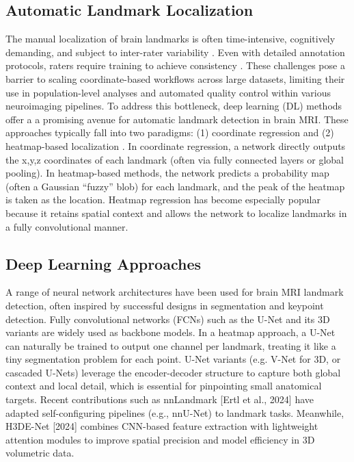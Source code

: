 \subsection{Automatic Landmark Localization}
The manual localization of brain landmarks is often time-intensive, cognitively demanding, and subject to inter-rater variability \cite{Abbass2022-lf, Lau2019-eh,Pallavaram2008-zr}. Even with detailed annotation protocols, raters require training to achieve consistency \cite{Lau2019-eh}. These challenges pose a barrier to scaling coordinate-based workflows across large datasets, limiting their use in population-level analyses and automated quality control within various neuroimaging pipelines. To address this bottleneck, deep learning (DL) methods offer a a promising avenue for automatic landmark detection in brain MRI. These approaches typically fall into two paradigms: (1) coordinate regression \cite{Neupane2024-vt} and (2) heatmap-based localization \cite{Payer2016-ik}. In coordinate regression, a network directly outputs the x,y,z coordinates of each landmark (often via fully connected layers or global pooling). In heatmap-based methods, the network predicts a probability map (often a Gaussian “fuzzy” blob) for each landmark, and the peak of the heatmap is taken as the location. Heatmap regression has become especially popular because it retains spatial context and allows the network to localize landmarks in a fully convolutional manner.

\subsection{Deep Learning Approaches}
A range of neural network architectures have been used for brain MRI landmark detection, often inspired by successful designs in segmentation and keypoint detection. Fully convolutional networks (FCNs) such as the U-Net and its 3D variants are widely used as backbone models. In a heatmap approach, a U-Net can naturally be trained to output one channel per landmark, treating it like a tiny segmentation problem for each point. U-Net variants (e.g. V-Net for 3D, or cascaded U-Nets) leverage the encoder-decoder structure to capture both global context and local detail, which is essential for pinpointing small anatomical targets. Recent contributions such as nnLandmark [Ertl et al., 2024] have adapted self-configuring pipelines (e.g., nnU-Net) to landmark tasks. Meanwhile, H3DE-Net [2024] combines CNN-based feature extraction with lightweight attention modules to improve spatial precision and model efficiency in 3D volumetric data.

